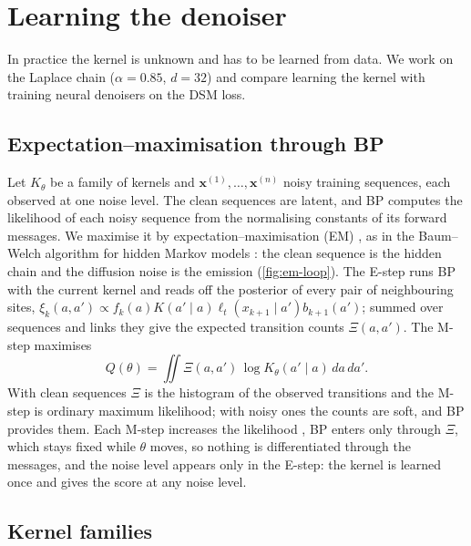 \documentclass{article}
\begin{document}
\section{Learning the denoiser}
\label{sec:learning}

In practice the kernel is unknown and has to be learned from data. We work on the Laplace chain ($\alpha=0.85$,
$d=32$) and compare learning the kernel with training neural denoisers on the DSM loss.

\subsection{Expectation--maximisation through BP}
\label{sec:em}

Let $K_\theta$ be a family of kernels and $\mathbf{x}^{(1)},\ldots,\mathbf{x}^{(n)}$ noisy training sequences, each
observed at one noise level. The clean sequences are latent, and BP computes the likelihood of each noisy sequence from
the normalising constants of its forward messages. We maximise it by expectation--maximisation (EM)
\cite{dempster1977maximum}, as in the Baum--Welch algorithm for hidden Markov models \cite{baum1970,rabiner1989tutorial}:
the clean sequence is the hidden chain and the diffusion noise is the emission (\cref{fig:em-loop}). The E-step runs BP
with the current kernel and reads off the posterior of every pair of neighbouring sites,
$\xi_k(a,a')\propto f_k(a)K(a'\mid a)\ell_t(x_{k+1}\mid a')b_{k+1}(a')$; summed over sequences and links they give the
expected transition counts $\Xi(a,a')$. The M-step maximises
\begin{equation}
    Q(\theta)=\iint\Xi(a,a')\,\log K_\theta(a'\mid a)\,da\,da'.
    \label{eq:em-objective}
\end{equation}
With clean sequences $\Xi$ is the histogram of the observed transitions and the M-step is ordinary maximum likelihood;
with noisy ones the counts are soft, and BP provides them. Each M-step increases the likelihood
\cite{dempster1977maximum,wu1983}, BP enters only through $\Xi$, which stays fixed while $\theta$ moves, so nothing is
differentiated through the messages, and the noise level appears only in the E-step: the kernel is learned once and
gives the score at any noise level.

\subsection{Kernel families}
\label{sec:kernel-families}
\end{document}
